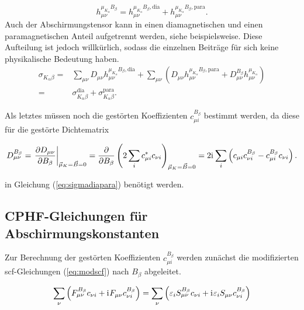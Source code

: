      \begin{equation}
     h_{\mu\nu}^{\mu_{K_\alpha}B_\beta}=h_{\mu\nu}^{\mu_{K_\alpha}B_\beta,\textrm{dia}}+h_{\mu\nu}^{\mu_{K_\alpha}B_\beta,\textrm{para}}.
	\end{equation}      
     Auch der Abschirmungstensor kann in einen diamagnetischen und einen paramagnetischen Anteil aufgetrennt werden, siehe beispielsweise\supercite{ditchfield1974self}. Diese Aufteilung ist jedoch willkürlich, sodass die einzelnen Beiträge für sich keine physikalische Bedeutung haben. 
     \begin{equation}\label{eq:sigmadiapara}
     \begin{aligned}
     \sigma_{K_\alpha\beta}=&\sum_{\mu\nu}D_{\mu\nu} h_{\mu\nu}^{\mu_{K_\alpha}B_\beta,\textrm{dia}} +\sum_{\mu\nu}\left(D_{\mu\nu} h_{\mu\nu}^{\mu_{K_\alpha}B_\beta,\textrm{para}}+D_{\mu\nu}^{B_\beta} h_{\mu\nu}^{\mu_{K_\alpha}}\right)\\
     =&\sigma_{K_\alpha\beta}^{\textrm{dia}}+\sigma_{K_\alpha\beta}^{\textrm{para}}.
     \end{aligned}
     \end{equation}
     
     Als letztes müssen noch die gestörten Koeffizienten $c_{\mu i}^{B_\beta}$ bestimmt werden, da diese für die gestörte Dichtematrix 
     
     \begin{equation}
     D_{\mu\nu}^{B_\beta}=\left.\frac{\partial D_{\mu\nu}}{\partial B_\beta}\right\vert_{\vec{\mu}_K=\vec{B}=0}=\frac{\partial}{\partial B_\beta}\left(2\sum_i c_{\mu i}^*c_{\nu i}\right)_{\vec{\mu}_K=\vec{B}=0}=2\mathrm{i}\mkern1mu \sum_i\left(c_{\mu i}c_{\nu i}^{B_\beta}-c_{\mu i}^{B_\beta}c_{\nu i}\right).
     \end{equation}
     
     in Gleichung (\ref{eq:sigmadiapara}) benötigt werden.
     
\subsection{CPHF-Gleichungen für Abschirmungskonstanten}\label{kap:cphf}

     Zur Berechnung der gestörten Koeffizienten $c_{\mu i}^{B_\beta}$ werden zunächst die modifizierten \ac{scf}-Gleichungen (\ref{eq:modscf}) nach $B_\beta$ abgeleitet.
     
    \begin{equation}
	\sum_{\nu}\left(F_{\mu\nu}^{B_\beta}c_{\nu i}+\mathrm{i}\mkern1mu F_{\mu\nu}c_{\nu i}^{B_\beta}\right)=\sum_{\nu}\left(\varepsilon_i S_{\mu\nu}^{B_\beta}c_{\nu i}+\mathrm{i}\mkern1mu\varepsilon_i S_{\mu\nu}c_{\nu i}^{B_\beta}\right)
	\end{equation}
     
